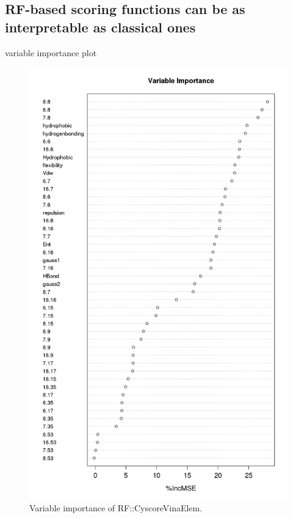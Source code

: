\documentclass[10pt,conference,compsocconf]{IEEEtran}
\begin{document}
\subsection{RF-based scoring functions can be as interpretable as classical ones}

variable importance plot

\begin{figure}
\centering
\includegraphics[width=1.37\linewidth,natwidth=960,natheight=1600]{../rfcyscore/x46/rf/trn-2280.png}
\caption{Variable importance of RF::CyscoreVinaElem.}
\label{fig:varimp}
\end{figure}
\end{document}
